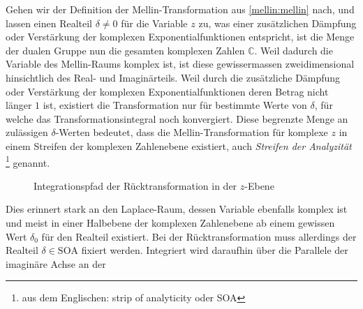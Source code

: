 Gehen wir der Definition der Mellin-Transformation aus 
\eqref{mellin:mellin} nach, und lassen einen Realteil $\delta \neq 0$ für 
die Variable $z$ zu, was einer zusätzlichen Dämpfung oder Verstärkung der 
komplexen Exponentialfunktionen entspricht, ist die Menge der dualen 
Gruppe nun die gesamten komplexen Zahlen $\mathbb{C}$.
Weil dadurch die Variable des Mellin-Raums komplex ist, ist diese 
gewissermassen zweidimensional hinsichtlich des Real- und Imaginärteils. 
Weil durch die zusätzliche Dämpfung oder Verstärkung der komplexen 
Exponentialfunktionen deren Betrag nicht länger $1$ ist, existiert die 
Transformation nur für bestimmte Werte von $\delta$, für welche das 
Transformationsintegral noch konvergiert.
Diese begrenzte Menge an zulässigen $\delta$-Werten bedeutet, dass die 
Mellin-Transformation für komplexe $z$ in einem Streifen der komplexen 
Zahlenebene existiert, auch {\em Streifen der Analyzität}
\footnote{aus dem Englischen: strip of analyticity oder SOA} genannt.
\begin{figure}
    \centering
    \caption{Integrationspfad der Rücktransformation in der $z$-Ebene
    \label{fig:mellin:z}}
\end{figure}
Dies erinnert stark an den Laplace-Raum, dessen Variable ebenfalls komplex 
ist und meist in einer Halbebene der komplexen Zahlenebene ab einem 
gewissen Wert $\delta_0$ für den Realteil existiert.
Bei der Rücktransformation muss allerdings der Realteil 
$\delta \in \text{SOA}$ fixiert werden. 
Integriert wird daraufhin über die Parallele der imaginäre Achse an der 

